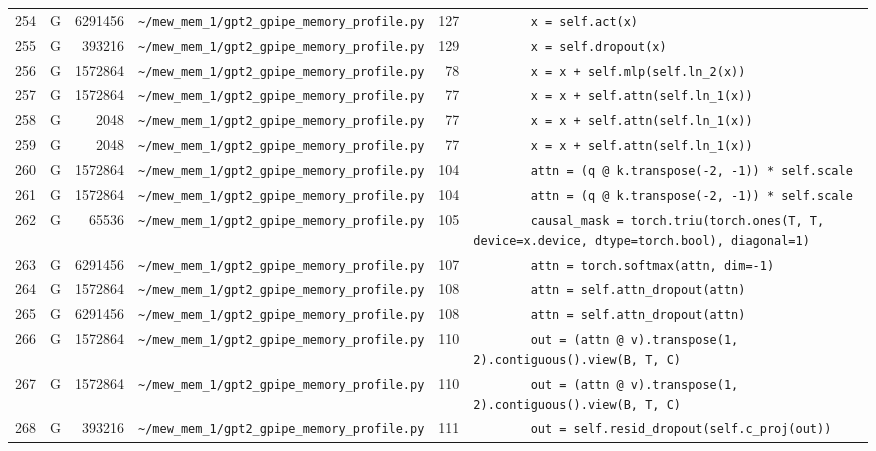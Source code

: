 \documentclass{article}
\begin{document}
\begin{longtable}{r l r p{6.5cm} r p{7.0cm}}
254 & G & 6291456 & \lstinline|~/mew_mem_1/gpt2_gpipe_memory_profile.py| & 127 & \lstinline|        x = self.act(x)| \\
255 & G & 393216 & \lstinline|~/mew_mem_1/gpt2_gpipe_memory_profile.py| & 129 & \lstinline|        x = self.dropout(x)| \\
256 & G & 1572864 & \lstinline|~/mew_mem_1/gpt2_gpipe_memory_profile.py| & 78 & \lstinline|        x = x + self.mlp(self.ln_2(x))| \\
257 & G & 1572864 & \lstinline|~/mew_mem_1/gpt2_gpipe_memory_profile.py| & 77 & \lstinline|        x = x + self.attn(self.ln_1(x))| \\
258 & G & 2048 & \lstinline|~/mew_mem_1/gpt2_gpipe_memory_profile.py| & 77 & \lstinline|        x = x + self.attn(self.ln_1(x))| \\
259 & G & 2048 & \lstinline|~/mew_mem_1/gpt2_gpipe_memory_profile.py| & 77 & \lstinline|        x = x + self.attn(self.ln_1(x))| \\
260 & G & 1572864 & \lstinline|~/mew_mem_1/gpt2_gpipe_memory_profile.py| & 104 & \lstinline|        attn = (q @ k.transpose(-2, -1)) * self.scale| \\
261 & G & 1572864 & \lstinline|~/mew_mem_1/gpt2_gpipe_memory_profile.py| & 104 & \lstinline|        attn = (q @ k.transpose(-2, -1)) * self.scale| \\
262 & G & 65536 & \lstinline|~/mew_mem_1/gpt2_gpipe_memory_profile.py| & 105 & \lstinline|        causal_mask = torch.triu(torch.ones(T, T, device=x.device, dtype=torch.bool), diagonal=1)| \\
263 & G & 6291456 & \lstinline|~/mew_mem_1/gpt2_gpipe_memory_profile.py| & 107 & \lstinline|        attn = torch.softmax(attn, dim=-1)| \\
264 & G & 1572864 & \lstinline|~/mew_mem_1/gpt2_gpipe_memory_profile.py| & 108 & \lstinline|        attn = self.attn_dropout(attn)| \\
265 & G & 6291456 & \lstinline|~/mew_mem_1/gpt2_gpipe_memory_profile.py| & 108 & \lstinline|        attn = self.attn_dropout(attn)| \\
266 & G & 1572864 & \lstinline|~/mew_mem_1/gpt2_gpipe_memory_profile.py| & 110 & \lstinline|        out = (attn @ v).transpose(1, 2).contiguous().view(B, T, C)| \\
267 & G & 1572864 & \lstinline|~/mew_mem_1/gpt2_gpipe_memory_profile.py| & 110 & \lstinline|        out = (attn @ v).transpose(1, 2).contiguous().view(B, T, C)| \\
268 & G & 393216 & \lstinline|~/mew_mem_1/gpt2_gpipe_memory_profile.py| & 111 & \lstinline|        out = self.resid_dropout(self.c_proj(out))| \\

\end{longtable}
\end{document}
